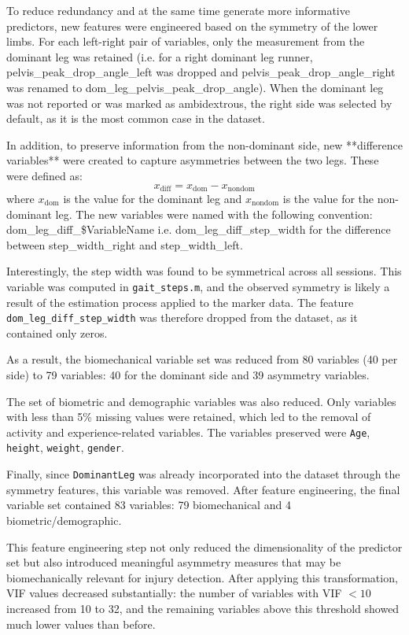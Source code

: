 To reduce redundancy and at the same time generate more informative predictors, new features were engineered based on the symmetry of the lower limbs. For each left-right pair of variables, only the measurement from the dominant leg was retained (i.e. for a right dominant leg runner, pelvis\_peak\_drop\_angle\_left was dropped and pelvis\_peak\_drop\_angle\_right was renamed to dom\_leg\_pelvis\_peak\_drop\_angle). When the dominant leg was not reported or was marked as ambidextrous, the right side was selected by default, as it is the most common case in the dataset.

In addition, to preserve information from the non-dominant side, new **difference variables** were created to capture asymmetries between the two legs. These were defined as:
\begin{equation}
    x_{\mathrm{diff}} = x_{\mathrm{dom}} - x_{\mathrm{nondom}}
\end{equation}
where $x_{\mathrm{dom}}$ is the value for the dominant leg and $x_{\mathrm{nondom}}$ is the value for the non-dominant leg. The new variables were named with the following convention: dom\_leg\_diff\_\$VariableName i.e. dom\_leg\_diff\_step\_width for the difference between step\_width\_right and step\_width\_left.

Interestingly, the step width was found to be symmetrical across all sessions. This variable was computed in \texttt{gait\_steps.m}, and the observed symmetry is likely a result of the estimation process applied to the marker data. The feature \texttt{dom\_leg\_diff\_step\_width} was therefore dropped from the dataset, as it contained only zeros.  

As a result, the biomechanical variable set was reduced from 80 variables (40 per side) to 79 variables: 40 for the dominant side and 39 asymmetry variables.  

The set of biometric and demographic variables was also reduced. Only variables with less than 5\% missing values were retained, which led to the removal of activity and experience-related variables. The variables preserved were \texttt{Age}, \texttt{height}, \texttt{weight}, \texttt{gender}.  

Finally, since \texttt{DominantLeg} was already incorporated into the dataset through the symmetry features, this variable was removed. After feature engineering, the final variable set contained 83 variables: 79 biomechanical and 4 biometric/demographic.

This feature engineering step not only reduced the dimensionality of the predictor set but also introduced meaningful asymmetry measures that may be biomechanically relevant for injury detection. After applying this transformation, VIF values decreased substantially: the number of variables with VIF $< 10$ increased from 10 to 32, and the remaining variables above this threshold showed much lower values than before.

